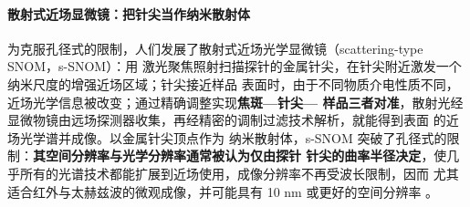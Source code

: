 \paragraph{散射式近场显微镜：把针尖当作纳米散射体}
为克服孔径式的限制，人们发展了散射式近场光学显微镜（scattering-type SNOM，s-SNOM）：用
激光聚焦照射扫描探针的金属针尖，在针尖附近激发一个纳米尺度的增强近场区域；针尖接近样品
表面时，由于不同物质介电性质不同，近场光学信息被改变；通过精确调整实现\textbf{焦斑—针尖—
样品三者对准}，散射光经显微物镜由远场探测器收集，再经精密的调制过滤技术解析，就能得到表面
的近场光学谱并成像。以金属针尖顶点作为
纳米散射体，s-SNOM 突破了孔径式的限制：\textbf{其空间分辨率与光学分辨率通常被认为仅由探针
针尖的曲率半径决定}，使几乎所有的光谱技术都能扩展到近场使用，成像分辨率不再受波长限制，因而
尤其适合红外与太赫兹波的微观成像，并可能具有 10 nm 或更好的空间分辨率
。

